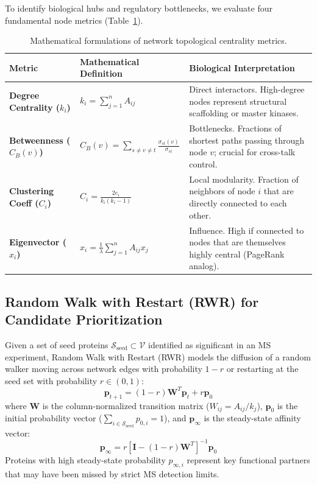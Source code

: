 \documentclass[11pt,twoside,openright]{book}
\begin{document}
To identify biological hubs and regulatory bottlenecks, we evaluate four fundamental node metrics (Table~\ref{tab:network_centralities}).

\begin{table}[htbp]
\centering
\small
\caption{Mathematical formulations of network topological centrality metrics.}
\label{tab:network_centralities}
\begin{tabularx}{\textwidth}{l p{4.8cm} X}
\toprule
\textbf{Metric} & \textbf{Mathematical Definition} & \textbf{Biological Interpretation} \\
\midrule
\textbf{Degree Centrality ($k_i$)} & 
$k_i = \sum_{j=1}^n A_{ij}$ & 
Direct interactors. High-degree nodes represent structural scaffolding or master kinases. \\
\addlinespace
\textbf{Betweenness ($C_B(v)$)} & 
$C_B(v) = \sum_{s \neq v \neq t} \frac{\sigma_{st}(v)}{\sigma_{st}}$ & 
Bottlenecks. Fractions of shortest paths passing through node $v$; crucial for cross-talk control. \\
\addlinespace
\textbf{Clustering Coeff ($C_i$)} & 
$C_i = \frac{2 e_i}{k_i(k_i - 1)}$ & 
Local modularity. Fraction of neighbors of node $i$ that are directly connected to each other. \\
\addlinespace
\textbf{Eigenvector ($x_i$)} & 
$x_i = \frac{1}{\lambda} \sum_{j=1}^n A_{ij} x_j$ & 
Influence. High if connected to nodes that are themselves highly central (PageRank analog). \\
\bottomrule
\end{tabularx}
\end{table}

\subsection{Random Walk with Restart (RWR) for Candidate Prioritization}

Given a set of seed proteins $\mathcal{S}_{\text{seed}} \subset \mathcal{V}$ identified as significant in an MS experiment, Random Walk with Restart (RWR) models the diffusion of a random walker moving across network edges with probability $1 - r$ or restarting at the seed set with probability $r \in (0, 1)$:
\begin{equation}
\label{eq:rwr}
\mathbf{p}_{t+1} = (1 - r) \mathbf{W}^T \mathbf{p}_t + r \mathbf{p}_0
\end{equation}
where $\mathbf{W}$ is the column-normalized transition matrix ($W_{ij} = A_{ij} / k_j$), $\mathbf{p}_0$ is the initial probability vector ($\sum_{i \in \mathcal{S}_{\text{seed}}} p_{0, i} = 1$), and $\mathbf{p}_\infty$ is the steady-state affinity vector:
\begin{equation}
\label{eq:rwr_steady}
\mathbf{p}_\infty = r \left[ \mathbf{I} - (1 - r)\mathbf{W}^T \right]^{-1} \mathbf{p}_0
\end{equation}
Proteins with high steady-state probability $p_{\infty, i}$ represent key functional partners that may have been missed by strict MS detection limits.
\end{document}
